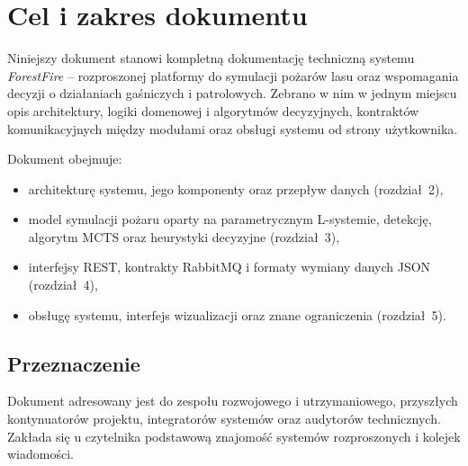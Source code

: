 \section{Cel i zakres dokumentu}

Niniejszy dokument stanowi kompletną dokumentację techniczną systemu \textit{ForestFire} -- rozproszonej platformy do symulacji pożarów lasu oraz wspomagania decyzji o działaniach gaśniczych i patrolowych. Zebrano w nim w jednym miejscu opis architektury, logiki domenowej i algorytmów decyzyjnych, kontraktów komunikacyjnych między modułami oraz obsługi systemu od strony użytkownika.

Dokument obejmuje:
\begin{itemize}
    \item architekturę systemu, jego komponenty oraz przepływ danych (rozdział~2),
    \item model symulacji pożaru oparty na parametrycznym L-systemie, detekcję, algorytm MCTS oraz heurystyki decyzyjne (rozdział~3),
    \item interfejsy REST, kontrakty RabbitMQ i formaty wymiany danych JSON (rozdział~4),
    \item obsługę systemu, interfejs wizualizacji oraz znane ograniczenia (rozdział~5).
\end{itemize}

\subsection{Przeznaczenie}

Dokument adresowany jest do zespołu rozwojowego i utrzymaniowego, przyszłych kontynuatorów projektu, integratorów systemów oraz audytorów technicznych. Zakłada się u czytelnika podstawową znajomość systemów rozproszonych i kolejek wiadomości.
